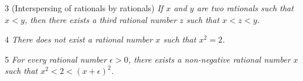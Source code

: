 \begin{proposition}{3}
    \label{rat-between-rats}
    (Interspersing of rationals by rationals) \emph{If $x$ and $y$ are two rationals
    such that $x < y$, then there exists a third rational number $z$ such that $x < z < y$.}
\end{proposition}

\begin{proposition}{4}
    \label{no-rat-sqrt-two}
    \emph{There does not exist a rational number $x$ such that $x^2 = 2$.}
\end{proposition}

\begin{proposition}{5}
    \label{rat-approx-sqrt-two}
    \emph{For every rational number $\epsilon > 0$, there exists a non-negative
    rational number $x$ such that $x^2 < 2 < (x + \epsilon)^2$.}
\end{proposition}

